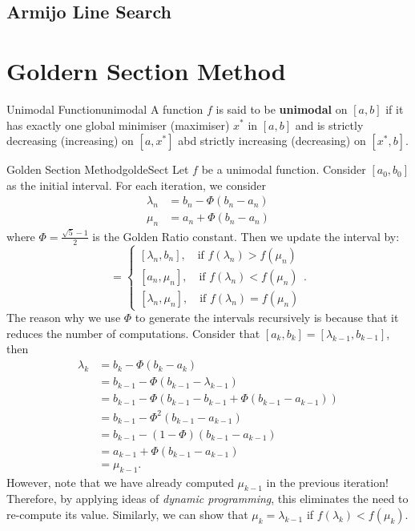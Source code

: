 \documentclass[math, code]{amznotes}
\theoremstyle{remark}
\begin{document}
\subsection{Armijo Line Search}

\section{Goldern Section Method}
\begin{dfnbox}{Unimodal Function}{unimodal}
    A function $f$ is said to be {\color{red} \textbf{unimodal}} on $[a, b]$ if it has exactly one global minimiser (maximiser) $x^*$ in $[a, b]$ and is strictly decreasing (increasing) on $[a, x^*]$ abd strictly increasing (decreasing) on $[x^*, b]$.
\end{dfnbox}
\begin{tecbox}{Golden Section Method}{goldeSect}
    Let $f$ be a unimodal function. Consider $[a_0, b_0]$ as the initial interval. For each iteration, we consider
    \begin{align*}
        \lambda_n & = b_n - \Phi(b_n - a_n) \\
        \mu_n & = a_n + \Phi(b_n - a_n)
    \end{align*}
    where $\Phi = \frac{\sqrt{5} - 1}{2}$ is the Golden Ratio constant. Then we update the interval by:
    \begin{equation*}
        [a_{n + 1}, b_{n + 1}] = \begin{cases}
            [\lambda_n, b_n], \quad \textrm{if } f(\lambda_n) > f(\mu_n)\\
            [a_n, \mu_n], \quad \textrm{if } f(\lambda_n) < f(\mu_n)\\
            [\lambda_n, \mu_n], \quad \textrm{if } f(\lambda_n) = f(\mu_n)
        \end{cases}.
    \end{equation*}
    The reason why we use $\Phi$ to generate the intervals recursively is because that it reduces the number of computations. Consider that $[a_k, b_k] = [\lambda_{k - 1}, b_{k - 1}]$, then
    \begin{align*}
        \lambda_k & = b_k - \Phi(b_k - a_k) \\
        & = b_{k - 1} - \Phi(b_{k - 1} - \lambda_{k - 1}) \\
        & = b_{k - 1} - \Phi(b_{k - 1} - b_{k - 1} + \Phi(b_{k - 1} - a_{k - 1})) \\
        & = b_{k - 1} - \Phi^2(b_{k - 1} - a_{k - 1}) \\
        & = b_{k - 1} - (1 - \Phi)(b_{k - 1} - a_{k - 1}) \\
        & = a_{k - 1} + \Phi(b_{k - 1} - a_{k - 1}) \\
        & = \mu_{k - 1}.
    \end{align*}
    However, note that we have already computed $\mu_{k - 1}$ in the previous iteration! Therefore, by applying ideas of \textit{dynamic programming}, this eliminates the need to re-compute its value. Similarly, we can show that $\mu_k = \lambda_{k - 1}$ if $f(\lambda_k) < f(\mu_k)$.
\end{tecbox}
\end{document}
